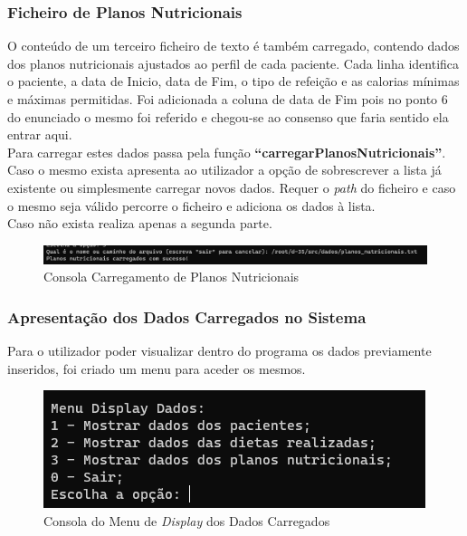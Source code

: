 \documentclass{article}
\begin{document}
\subsubsection{Ficheiro de Planos Nutricionais}
O conteúdo de um terceiro ficheiro de texto é também carregado, contendo dados dos planos nutricionais ajustados ao perfil de cada paciente. Cada linha identifica o paciente, a data de Inicio, data de Fim, o tipo de refeição e as calorias mínimas e máximas permitidas. Foi adicionada a coluna de data de Fim pois no ponto 6 do enunciado o mesmo foi referido e chegou-se ao consenso que faria sentido ela entrar aqui. \\Para carregar estes dados passa pela função \textbf{“carregarPlanosNutricionais”}. \\ Caso o mesmo exista apresenta ao utilizador a opção de sobrescrever a lista já existente ou simplesmente carregar novos dados. Requer o \emph{path} do ficheiro e caso o mesmo seja válido percorre o ficheiro e adiciona os dados à lista. \\Caso não exista realiza apenas a segunda parte.\\

\begin{figure}[h]
    \centering
    \includegraphics[width=0.8\linewidth]{CarregarPlanos.png}
    \caption{Consola Carregamento de Planos Nutricionais}
    \label{fig:enter-label}
\end{figure}

\subsubsection{Apresentação dos Dados Carregados no Sistema}
Para o utilizador poder visualizar dentro do programa os dados previamente inseridos, foi criado um menu para aceder os mesmos.

\begin{figure}[h]
    \centering
    \includegraphics[width=0.6\linewidth]{MenuMostrarDados.png}
    \caption{Consola do Menu de \emph{Display} dos Dados Carregados}
    \label{fig:enter-label}
\end{figure}
\end{document}
